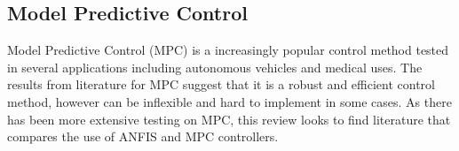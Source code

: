 \subsection{Model Predictive Control}
Model Predictive Control (MPC) is a increasingly popular control method tested in several applications including autonomous vehicles and medical uses. The results from literature for MPC suggest that it is a robust and efficient control method, however can be inflexible and hard to implement in some cases. As there has been more extensive testing on MPC, this review looks to find literature that compares the use of ANFIS and MPC controllers. 

